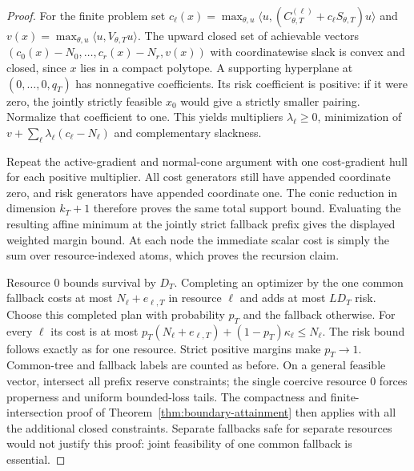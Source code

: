 \begin{proof}
For the finite problem set $c_\ell(x)=\max_{\theta,u}\langle u,(C_{\theta,T}^{(\ell)}+c_\ell S_{\theta,T})u\rangle$ and $v(x)=\max_{\theta,u}\langle u,V_{\theta,T}u\rangle$. The upward closed set of achievable vectors $(c_0(x)-N_0,\ldots,c_r(x)-N_r,v(x))$ with coordinatewise slack is convex and closed, since $x$ lies in a compact polytope. A supporting hyperplane at $(0,\ldots,0,q_T)$ has nonnegative coefficients. Its risk coefficient is positive: if it were zero, the jointly strictly feasible $x_0$ would give a strictly smaller pairing. Normalize that coefficient to one. This yields multipliers $\lambda_\ell\ge0$, minimization of $v+\sum_\ell\lambda_\ell(c_\ell-N_\ell)$ and complementary slackness.

Repeat the active-gradient and normal-cone argument with one cost-gradient hull for each positive multiplier. All cost generators still have appended coordinate zero, and risk generators have appended coordinate one. The conic reduction in dimension $k_T+1$ therefore proves the same total support bound. Evaluating the resulting affine minimum at the jointly strict fallback prefix gives the displayed weighted margin bound. At each node the immediate scalar cost is simply the sum over resource-indexed atoms, which proves the recursion claim.

Resource 0 bounds survival by $D_T$. Completing an optimizer by the one common fallback costs at most $N_\ell+e_{\ell,T}$ in resource $\ell$ and adds at most $LD_T$ risk. Choose this completed plan with probability $p_T$ and the fallback otherwise. For every $\ell$ its cost is at most
$p_T(N_\ell+e_{\ell,T})+(1-p_T)\kappa_\ell\le N_\ell$.
The risk bound follows exactly as for one resource. Strict positive margins make $p_T\to1$. Common-tree and fallback labels are counted as before. On a general feasible vector, intersect all prefix reserve constraints; the single coercive resource 0 forces properness and uniform bounded-loss tails. The compactness and finite-intersection proof of Theorem~\ref{thm:boundary-attainment} then applies with all the additional closed constraints. Separate fallbacks safe for separate resources would not justify this proof: joint feasibility of one common fallback is essential.
\end{proof}

